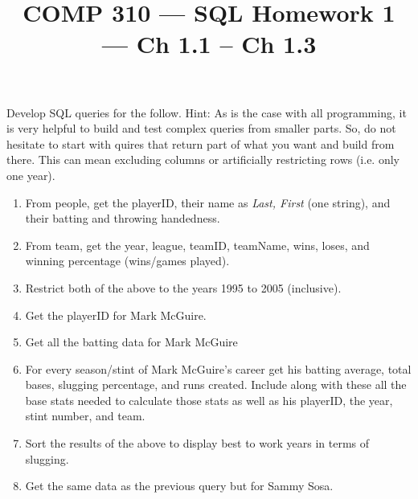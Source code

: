 \documentclass[nobib]{tufte-handout}
\title{COMP 310 --- SQL Homework 1 --- Ch 1.1 -- Ch 1.3}
\author{  }
\date{ }
\begin{document}
\maketitle

Develop SQL queries for the follow. Hint: As is the case with all programming, it is very helpful to build and test complex queries from smaller parts. So, do not hesitate to start with quires that return part of what you want and build from there. This can mean excluding columns or artificially restricting rows (i.e. only one year). 

\begin{enumerate}
    \item From people, get the playerID, their name as \textit{Last, First} (one string), and their batting and throwing handedness. 
    \item From team, get the year, league, teamID, teamName, wins, loses, and winning percentage (wins/games played). 
    \item Restrict both of the above to the years 1995 to 2005 (inclusive).
    \item Get the playerID for Mark McGuire.  
    \item Get all the batting data for Mark McGuire
    \item For every season/stint of Mark McGuire's career get his batting average, total bases, slugging percentage, and runs created. Include along with these all the base stats needed to calculate those stats as well as his playerID, the year, stint number, and team. 
    \item Sort the results of the above to display best to work years in terms of slugging. 
    \item Get the same data as the previous query but for Sammy Sosa. 
\end{enumerate}
\end{document}

